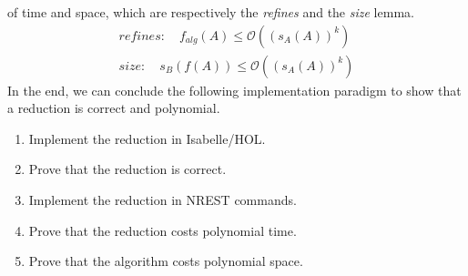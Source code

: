 of time and space, which are respectively the \textit{refines} and the \textit{size} lemma.
\begin{align}
    refines: \quad f_{alg}(A) \leq \mathcal{O}((s_A(A))^k) \\
    size: \quad s_B (f(A)) \leq \mathcal{O}((s_A(A))^k)
\end{align}
In the end, we can conclude the following implementation paradigm to show that a reduction is correct and polynomial.
\begin{enumerate}
    \item Implement the reduction in Isabelle/HOL.
    \item Prove that the reduction is correct.
    \item Implement the reduction in NREST commands.
    \item Prove that the reduction costs polynomial time.
    \item Prove that the algorithm costs polynomial space.
\end{enumerate}
